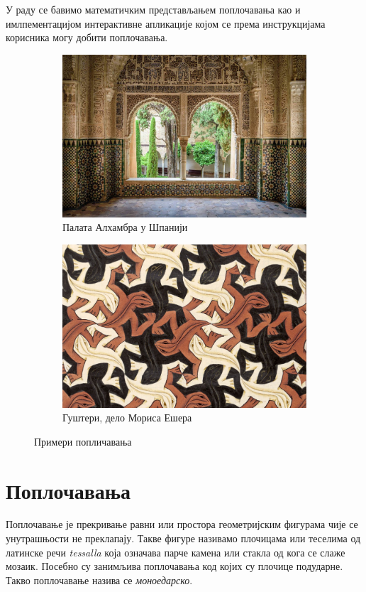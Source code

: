 \documentclass[12pt]{article}
\begin{document}
У раду се бавимо математичким представљањем поплочавања као и имлпементацијом интерактивне апликације којом се према инструкцијама корисника могу добити поплочавања.



\begin{figure}[H]

\begin{subfigure}[b]{0.5\textwidth}
    \includegraphics[width=.9\textwidth]{alhambra.jpg}
    \caption{Палата Алхамбра у Шпанији}
    \label{fig:alh}
  \end{subfigure}
  \begin{subfigure}[b]{0.5\textwidth}
    \includegraphics[width=.9\textwidth]{eser.jpg}
    \caption{Гуштери, дело Мориса Ешера}
    \label{fig:eser}
  \end{subfigure}
  \caption{Примери попличавања}
\end{figure}

\newpage

\section{Поплочавања}\label{kristalografske-grupe-i-poploux10davanje}
Поплочавање је прекривање равни или простора геометријским фигурама чије се унутрашњости не преклапају. Такве фигуре називамо плочицама или теселима од латинске речи \emph{tessalla} која означава парче камена или стакла од кога се слаже мозаик. Посебно
су занимљива поплочавања код којих су плочице подударне. Такво поплочавање назива се \emph{моноедарско}.
\end{document}
